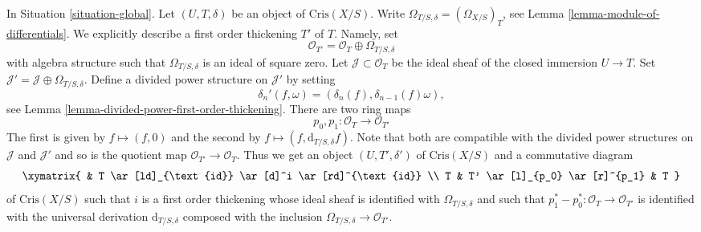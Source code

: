 \begin{remark}
\label{remark-first-order-thickening}
In Situation \ref{situation-global}.
Let $(U, T, \delta)$ be an object of $\text{Cris}(X/S)$.
Write $\Omega_{T/S, \delta} = (\Omega_{X/S})_T$, see
Lemma \ref{lemma-module-of-differentials}.
We explicitly describe a first order thickening $T'$ of
$T$. Namely, set
$$
\mathcal{O}_{T'} = \mathcal{O}_T \oplus \Omega_{T/S, \delta}
$$
with algebra structure such that $\Omega_{T/S, \delta}$ is an
ideal of square zero. Let $\mathcal{J} \subset \mathcal{O}_T$
be the ideal sheaf of the closed immersion $U \to T$. Set
$\mathcal{J}' = \mathcal{J} \oplus \Omega_{T/S, \delta}$.
Define a divided power structure on $\mathcal{J}'$ by setting
$$
\delta_n'(f, \omega) = (\delta_n(f), \delta_{n - 1}(f)\omega),
$$
see Lemma \ref{lemma-divided-power-first-order-thickening}.
There are two ring maps
$$
p_0, p_1 : \mathcal{O}_T \to \mathcal{O}_{T'}
$$
The first is given by $f \mapsto (f, 0)$ and the second by
$f \mapsto (f, \text{d}_{T/S, \delta}f)$. Note that both are compatible
with the divided power structures on $\mathcal{J}$ and $\mathcal{J}'$
and so is the quotient map $\mathcal{O}_{T'} \to \mathcal{O}_T$.
Thus we get an object $(U, T', \delta')$ of $\text{Cris}(X/S)$
and a commutative diagram
$$
\xymatrix{
& T \ar[ld]_{\text{id}} \ar[d]^i \ar[rd]^{\text{id}} \\
T & T' \ar[l]_{p_0} \ar[r]^{p_1} & T
}
$$
of $\text{Cris}(X/S)$ such that $i$ is a first order thickening whose ideal
sheaf is identified with $\Omega_{T/S, \delta}$ and such that
$p_1^* - p_0^* : \mathcal{O}_T \to \mathcal{O}_{T'}$
is identified with the universal derivation $\text{d}_{T/S, \delta}$
composed with the inclusion $\Omega_{T/S, \delta} \to \mathcal{O}_{T'}$.
\end{remark}

